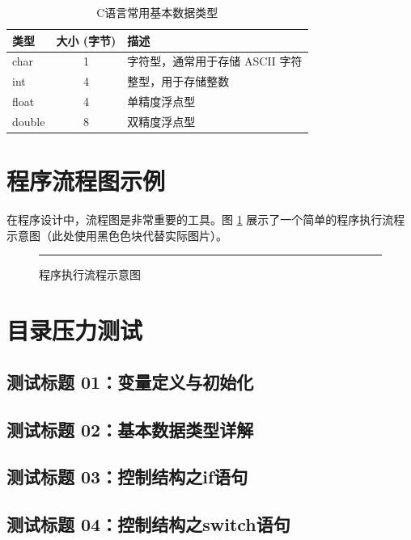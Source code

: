 \begin{table}[htbp]
    \centering
    \caption{C语言常用基本数据类型}
    \label{tab:datatypes}
    \begin{tabularx}{0.9\textwidth}{l c X}
        \toprule
        \textbf{类型} & \textbf{大小 (字节)} & \textbf{描述} \\
        \midrule
        char & 1 & 字符型，通常用于存储 ASCII 字符 \\
        int & 4 & 整型，用于存储整数 \\
        float & 4 & 单精度浮点型 \\
        double & 8 & 双精度浮点型 \\
        \bottomrule
    \end{tabularx}
\end{table}

\newpage

\section{程序流程图示例}

在程序设计中，流程图是非常重要的工具。图 \ref{fig:flowchart} 展示了一个简单的程序执行流程示意图（此处使用黑色色块代替实际图片）。

\begin{figure}[htbp]
    \centering
    \rule{0.6\linewidth}{5cm}
    \caption{程序执行流程示意图}
    \label{fig:flowchart}
\end{figure}

\section{目录压力测试}
\subsection{测试标题 01：变量定义与初始化}
\subsection{测试标题 02：基本数据类型详解}
\subsection{测试标题 03：控制结构之if语句}
\subsection{测试标题 04：控制结构之switch语句}
